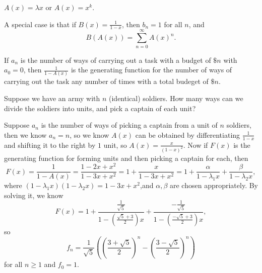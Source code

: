 \begin{eg}
    \(A(x) = \lambda x\) or \(A(x) = x^k\).   
\end{eg}

A special case is that if \(B(x) = \frac{1}{1-x}\), then \(b_n = 1\) for all \(n\), and
\[
    B(A(x)) = \sum_{n=0}^{\infty} A(x)^n. 
\] 

\begin{claim}
    If \(a_n\) is the number of ways of carrying out a task with a budget of \(\$ n\) with \(a_0 = 0\), then \(\frac{1}{1 - A(x)}\) is the generating function for the number of ways of carrying out the task any number of times with a total budeget of \(\$ n\).     
\end{claim}

\begin{eg}
    Suppose we have an army with \(n\) (identical) soldiers. How many ways can we divide the soldiers into units, and pick a captain of each unit?
\end{eg}
\begin{explanation}
    Suppose \(a_n\) is the number of ways of picking a captain from a unit of \(n\) soldiers, then we know \(a_n = n\), so we know \(A(x)\) can be obtained by differentiating \(\frac{1}{1-x}\) and shifting it to the right by \(1\) unit, so \(A(x) = \frac{x}{(1-x)^2}\). Now if \(F(x)\) is the generating function for forming units and then picking a captain for each, then 
    \[
        F(x) = \frac{1}{1- A(x)} = \frac{1 - 2x + x^2}{1 - 3x + x^2} = 1 + \frac{x}{1 - 3x + x^2} = 1 + \frac{\alpha}{1 - \lambda_1 x} + \frac{\beta }{1 - \lambda _2 x},
    \] where \((1 - \lambda _1 x)(1 - \lambda _2 x) = 1 - 3x + x^2\),and \(\alpha , \beta \) are chosen appropriately. By solving it, we know 
    \[
        F(x) = 1 + \frac{\frac{1}{\sqrt{5} }}{1 - \left( \frac{\sqrt{5} + 3 }{2} \right) x } + \frac{-\frac{1}{\sqrt{5} }}{1 - \left( \frac{-\sqrt{5} + 3 }{2} \right)  x}, 
    \] so 
    \[
        f_n = \frac{1}{\sqrt{5} } \left( \left( \frac{3 + \sqrt{5} }{2} \right)^n - \left( \frac{3 - \sqrt{5} }{2} \right)^n   \right) 
    \] for all \(n \ge 1\) and \(f_0 = 1\).    
\end{explanation}